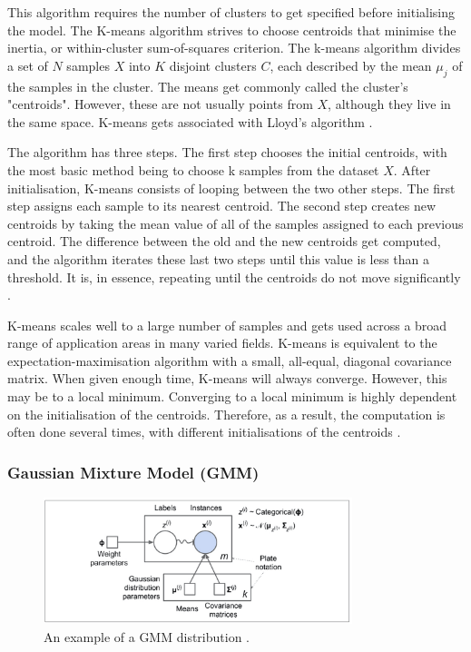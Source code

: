 	This algorithm requires the number of clusters to get specified before initialising the model. The K-means algorithm strives to choose centroids that minimise the inertia, or within-cluster sum-of-squares criterion. The k-means algorithm divides a set of $N$ samples $X$ into $K$ disjoint clusters $C$, each described by the mean $\mu_j$ of the samples in the cluster. The means get commonly called the cluster's "centroids". However, these are not usually points from $X$, although they live in the same space. K-means gets associated with Lloyd's algorithm \cite{geron2019hands, sklearn_km}. 
	
	The algorithm has three steps. The first step chooses the initial centroids, with the most basic method being to choose k samples from the dataset $X$. After initialisation, K-means consists of looping between the two other steps. The first step assigns each sample to its nearest centroid. The second step creates new centroids by taking the mean value of all of the samples assigned to each previous centroid. The difference between the old and the new centroids get computed, and the algorithm iterates these last two steps until this value is less than a threshold. It is, in essence, repeating until the centroids do not move significantly \cite{geron2019hands, sklearn_km}.
	
	K-means scales well to a large number of samples and gets used across a broad range of application areas in many varied fields. K-means is equivalent to the expectation-maximisation algorithm with a small, all-equal, diagonal covariance matrix. When given enough time, K-means will always converge. However, this may be to a local minimum. Converging to a local minimum is highly dependent on the initialisation of the centroids. Therefore, as a result, the computation is often done several times, with different initialisations of the centroids \cite{sklearn_km}.
	
	\subsubsection{Gaussian Mixture Model (GMM)}
	
	\begin{figure}[t]
		\begin{center}
			\includegraphics[width=9cm]{graphics/gmm_example.jpeg}
			\caption{An example of a GMM distribution \cite{geron2019hands}.}
			\label{fig:gmm_example}
		\end{center}
		
	\end{figure}
	
